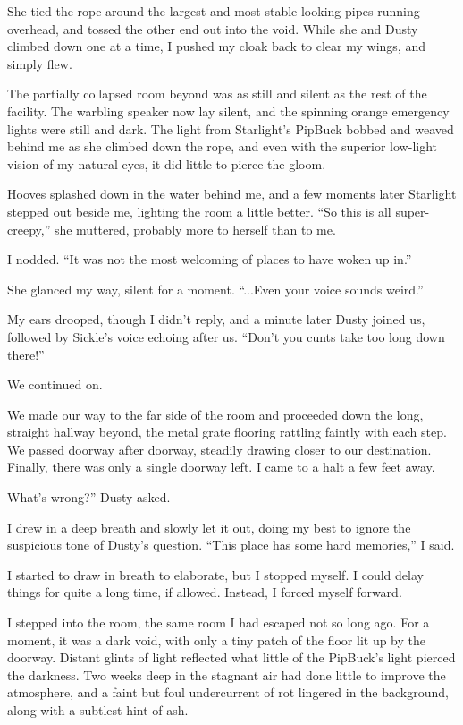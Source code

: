 She tied the rope around the largest and most stable-looking pipes running overhead, and tossed the other end out into the void. While she and Dusty climbed down one at a time, I pushed my cloak back to clear my wings, and simply flew.

The partially collapsed room beyond was as still and silent as the rest of the facility. The warbling speaker now lay silent, and the spinning orange emergency lights were still and dark. The light from Starlight’s PipBuck bobbed and weaved behind me as she climbed down the rope, and even with the superior low-light vision of my natural eyes, it did little to pierce the gloom.

Hooves splashed down in the water behind me, and a few moments later Starlight stepped out beside me, lighting the room a little better. “So this is all super-creepy,” she muttered, probably more to herself than to me.

I nodded. “It was not the most welcoming of places to have woken up in.”

She glanced my way, silent for a moment. “...Even your voice sounds weird.”

My ears drooped, though I didn’t reply, and a minute later Dusty joined us, followed by Sickle’s voice echoing after us. “Don’t you cunts take too long down there!”

We continued on.

We made our way to the far side of the room and proceeded down the long, straight hallway beyond, the metal grate flooring rattling faintly with each step. We passed doorway after doorway, steadily drawing closer to our destination. Finally, there was only a single doorway left. I came to a halt a few feet away.

\leavevmode{}What’s wrong?” Dusty asked.

I drew in a deep breath and slowly let it out, doing my best to ignore the suspicious tone of Dusty’s question. “This place has some hard memories,” I said.

I started to draw in breath to elaborate, but I stopped myself. I could delay things for quite a long time, if allowed. Instead, I forced myself forward.

I stepped into the room, the same room I had escaped not so long ago. For a moment, it was a dark void, with only a tiny patch of the floor lit up by the doorway. Distant glints of light reflected what little of the PipBuck’s light pierced the darkness. Two weeks deep in the stagnant air had done little to improve the atmosphere, and a faint but foul undercurrent of rot lingered in the background, along with a subtlest hint of ash.

